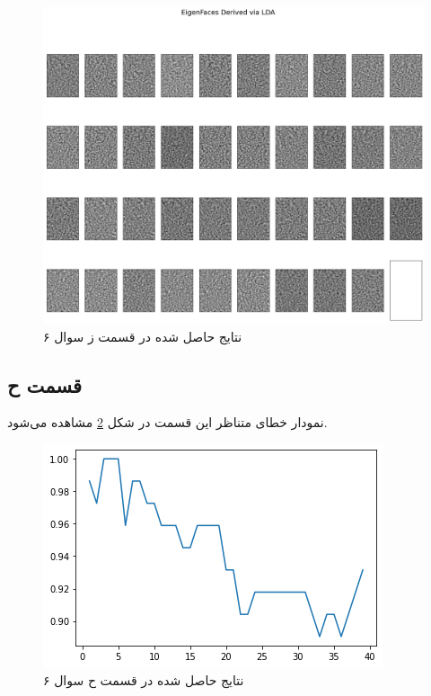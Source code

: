 \documentclass{article}
\begin{document}
\begin{figure}[h]
    \centering
    \includegraphics[scale=0.3]{images/q6/partg.png}
    \caption{نتایج حاصل شده در قسمت ز سوال ۶}
    \label{fisher_eigenfaces}
\end{figure}

\subsection*{قسمت ح}

نمودار خطای متناظر این قسمت در شکل \ref{parth_results} مشاهده می‌شود.

\begin{figure}[h]
    \centering
    \includegraphics[scale=0.5]{images/q6/parth_results.png}
    \caption{نتایج حاصل شده در قسمت ح سوال ۶}
    \label{parth_results}
\end{figure}

\newpage
\pagebreak
\end{document}
